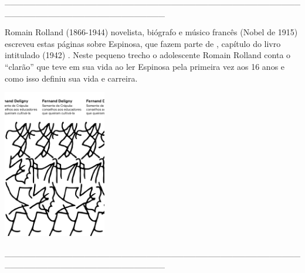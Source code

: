 {\hspace*{-2cm}\_\_\_\_\_\_\_\_\_\_\_\_\_\_\_\_\_\_\_\_\_\_\_\_\_\_\_\_\_\_\_\_\_\_\_\_\_\_\_\_\_\_\_\_\_\_\_\_\_\_\_\_\_\_\_\_\_\_\_\_\_\_\_\_\_\_\_\_\_\_\_\_\_\_

\medskip

\noindent{}Romain Rolland (1866-1944) novelista, biógrafo e músico francês (Nobel de 1915) escreveu estas páginas sobre Espinosa, que fazem parte de {}, capítulo do livro intitulado {} (1942) . Neste pequeno trecho o adolescente Romain Rolland conta o “clarão” que teve em sua vida ao ler Espinosa pela primeira vez aos 16 anos e como isso definiu sua vida e carreira.

\hspace{.5cm}

\hspace*{-.4cm}\begin{minipage}[c]{0.90\linewidth}
\small{
{}}
\end{minipage}

\pagebreak

\hspace{.5cm}

\begin{center}
\hspace*{-.5cm}\includegraphics[width=45mm]{./imgs/deligny.png}
\end{center}

\hspace*{-2cm}\_\_\_\_\_\_\_\_\_\_\_\_\_\_\_\_\_\_\_\_\_\_\_\_\_\_\_\_\_\_\_\_\_\_\_\_\_\_\_\_\_\_\_\_\_\_\_\_\_\_\_\_\_\_\_\_\_\_\_\_\_\_\_\_\_\_\_\_\_\_\_\_\_\_

}
